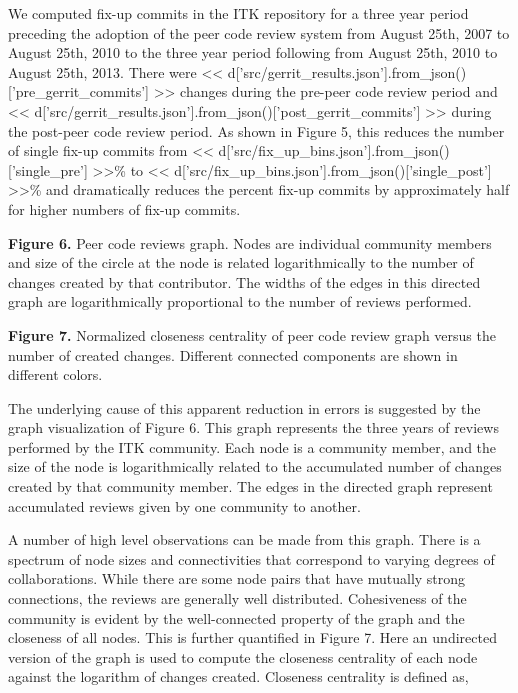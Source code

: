 \documentclass{frontiersENG} %
\begin{document}
We computed fix-up commits in the ITK repository for a three year period
preceding the adoption of the peer code review system from August 25th, 2007
to August 25th, 2010 to the three year period following from August 25th, 2010
to August 25th, 2013.  There were
<< d['src/gerrit_results.json'].from_json()['pre_gerrit_commits'] >>
changes during the pre-peer code review period and
<< d['src/gerrit_results.json'].from_json()['post_gerrit_commits'] >>
during the post-peer code review period.  As shown in
Figure 5, this reduces the number of
single fix-up commits from <<
d['src/fix_up_bins.json'].from_json()['single_pre'] >>\%
to << d['src/fix_up_bins.json'].from_json()['single_post'] >>\% and
dramatically reduces the percent fix-up commits by approximately half for
higher numbers of fix-up commits.

\textbf{Figure 6. } {Peer code reviews graph.  Nodes are individual community
members and size of the circle at the node is related logarithmically to the
number of changes created by that contributor. The widths of the edges in
this directed graph are logarithmically proportional to the number of reviews
performed.} \label{fig:06}

\textbf{Figure 7. }{Normalized closeness centrality of peer code review graph
versus the number of created changes.  Different connected components are shown
in different colors.}\label{fig:07}

The underlying cause of this apparent reduction in errors is suggested by the
graph visualization of Figure 6. This graph represents the three years of
reviews performed by the ITK community. Each node is a community member, and
the size of the node is logarithmically related to the accumulated number of
changes created by that community member.  The edges in the directed graph
represent accumulated reviews given by one community to another.

A number of high level observations can be made from this graph.  There is a
spectrum of node sizes and connectivities that correspond to varying degrees
of collaborations. While there are some node pairs that have mutually strong
connections, the reviews are generally well distributed.  Cohesiveness of the
community is evident by the well-connected property of the graph and the
closeness of all nodes.  This is further quantified in Figure 7.  Here an
undirected version of the graph is used to compute the closeness centrality of
each node against the logarithm of changes created.  Closeness centrality is
defined as, \cite{Freeman1979}
\end{document}
